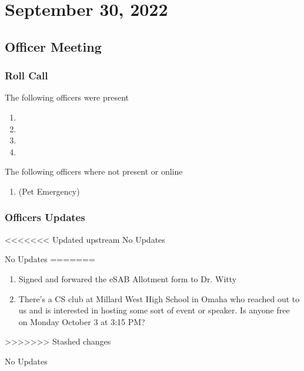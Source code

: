 \section{September 30, 2022}
\subsection{Officer Meeting}

\subsubsection{Roll Call}
The following officers were present

\begin{enumerate}
    \item \president
    \item \tresurer
    \item \primaryprogrammer
    \item \secretary
\end{enumerate}

The following officers where not present or online

\begin{enumerate}
    \item \vicepresident (Pet Emergency)
\end{enumerate}

\subsubsection{Officers Updates}

\textbf{\president}

<<<<<<< Updated upstream
No Updates

\textbf{\vicepresident}

No Updates
=======
\begin{enumerate}
    \item Signed and forwared the eSAB Allotment form to Dr. Witty
    \item There's a CS club at Millard West High School in Omaha who reached out to us and is interested in hosting some sort of event or speaker. Is anyone free on Monday October 3 at 3:15 PM?
\end{enumerate}
>>>>>>> Stashed changes

\textbf{\vicepresident}

No Updates

\textbf{\tresurer}

